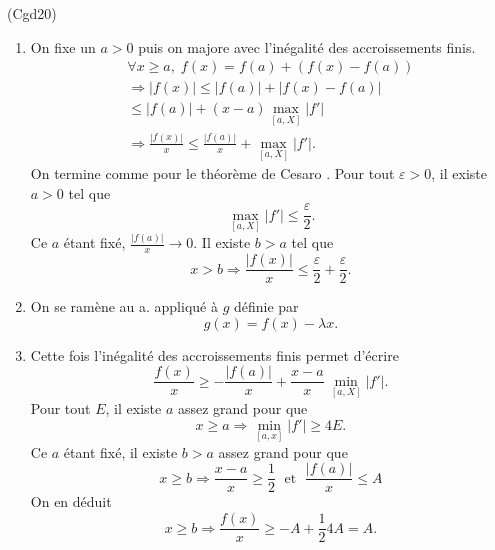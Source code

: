 \begin{tiny}(Cgd20)\end{tiny}
\begin{enumerate}
  \item On fixe un $a >0$ puis on majore avec l'inégalité des accroissements finis.
\begin{multline*}
  \forall x \geq a, \;
  f(x) = f(a) + \left(f(x) - f(a)\right)\\
  \Rightarrow |f(x)| \leq |f(a)| + \left| f(x) - f(a)\right|\\
  \leq |f(a)| + (x-a)\max_{\left[a,X\right]}|f'| \\
  \Rightarrow \frac{|f(x)|}{x} \leq \frac{|f(a)|}{x} + \max_{\left[a,X\right]}|f'|.
\end{multline*}
On termine comme pour le théorème de Cesaro .\newline
Pour tout $\varepsilon >0$, il existe $a>0$ tel que
\[
  \max_{\left[a,X\right]}|f'|\leq \frac{\varepsilon}{2}.
\]
Ce $a$ étant fixé, $\frac{|f(a)|}{x} \rightarrow 0$. Il existe $b >a$ tel que
\[
  x >b \Rightarrow
  \frac{|f(x)|}{x} \leq \frac{\varepsilon}{2} + \frac{\varepsilon}{2}.
\]

  \item On se ramène au a. appliqué à $g$ définie par
\[
  g(x) = f(x) - \lambda x.
\]

  \item Cette fois l'inégalité des accroissements finis permet d'écrire
\[
  \frac{f(x)}{x} \geq -\frac{|f(a)|}{x} + \frac{x-a}{x}\,\min_{\left[a,X\right]}|f'|. 
\]
Pour tout $E$, il existe $a$ assez grand pour que 
\[
 x\geq a \Rightarrow  \min_{\left[a,x\right]}|f'| \geq 4E.
\]
Ce $a$ étant fixé, il existe $b >a$ assez grand pour que
\[
  x \geq b \Rightarrow \frac{x-a}{x} \geq \frac{1}{2} \;\text{ et }\; \frac{|f(a)|}{x} \leq A
\]
On en déduit
\[
  x \geq b \Rightarrow \frac{f(x)}{x} \geq - A + \frac{1}{2} 4 A = A. 
\]

\end{enumerate}
